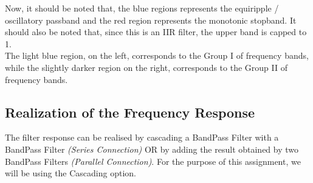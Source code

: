 \documentclass{article}
\begin{document}
Now, it should be noted that, the blue regions represents the equiripple / oscillatory passband and the red region represents the monotonic stopband. It should also be noted that, since this is an IIR filter, the upper band is capped to 1.\\
The light blue region, on the left, corresponds to the Group I of frequency bands, while the slightly darker region on the right, corresponds to the Group II of frequency bands.\\



\subsection{Realization of the Frequency Response}
The filter response can be realised by cascading a BandPass Filter with a BandPass Filter \textit{(Series Connection)} OR by adding the result obtained by two BandPass Filters \textit{(Parallel Connection)}. For the purpose of this assignment, we will be using the Cascading option.\\
\end{document}
